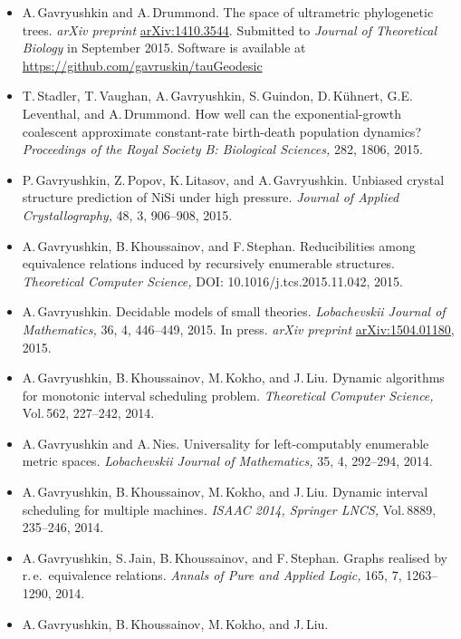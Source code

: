 \documentclass[12pt]{article}
\begin{document}
\iftoggle{full}{
\centerline{\bf Publications}
}{
\centerline{\bf Recent publications}
}
\begin{itemize}
\item A.\,Gavryushkin and A.\,Drummond.
	The space of ultrametric phylogenetic trees.
	{\em arXiv preprint} \href{http://arxiv.org/abs/1410.3544}{arXiv:1410.3544}.
	Submitted to {\em Journal of Theoretical Biology} in September 2015.
	Software is available at
	\href{https://github.com/gavruskin/tauGeodesic}{https://github.com/gavruskin/tauGeodesic}
\item T.\,Stadler, T.\,Vaughan, A.\,Gavryushkin, S.\,Guindon, D.\,K\"uhnert, G.E.\,Leventhal, and A.\,Drummond.
	How well can the exponential-growth coalescent approximate constant-rate birth-death population dynamics?
	{\em Proceedings of the Royal Society B: Biological Sciences,} 282, 1806, 2015.
\item P.\,Gavryushkin, Z.\,Popov, K.\,Litasov, and A.\,Gavryushkin.
	Unbiased crystal structure prediction of $\mathrm{NiSi}$ under high pressure.
	{\em Journal of Applied Crystallography,} 48, 3, 906--908, 2015.
\item A.\,Gavryushkin, B.\,Khoussainov, and F.\,Stephan.
	Reducibilities among equivalence relations induced by recursively enumerable structures.
	{\em Theoretical Computer Science,} DOI: 10.1016/j.tcs.2015.11.042, 2015.
\item A.\,Gavryushkin.
	Decidable models of small theories.
	{\em Lobachevskii Journal of Mathematics,} 36, 4, 446--449, 2015.
	In press.
	{\em arXiv preprint} \href{http://arxiv.org/abs/1504.01180}{arXiv:1504.01180}, 2015.
\item A.\,Gavryushkin, B.\,Khoussainov, M.\,Kokho, and J.\,Liu.
	Dynamic algorithms for monotonic interval scheduling problem.
	{\em Theoretical Computer Science,} Vol.\,562, 227--242, 2014.
\item A.\,Gavryushkin and A.\,Nies.
	Universality for left-computably enumerable  metric spaces.
	{\em Lobachevskii Journal of Mathematics,} 35, 4, 292--294, 2014.
\item A.\,Gavryushkin, B.\,Khoussainov, M.\,Kokho, and J.\,Liu.
	Dynamic interval scheduling for multiple machines.
	{\em ISAAC 2014, Springer LNCS,} Vol.\,8889, 235--246, 2014.
\item A.\,Gavryushkin, S.\,Jain, B.\,Khoussainov, and F.\,Stephan.
	Graphs realised by r.\,e.\ equivalence relations.
	{\em Annals of Pure and Applied Logic,} 165, 7, 1263--1290, 2014.
\item A.\,Gavryushkin, B.\,Khoussainov, M.\,Kokho, and J.\,Liu.

\end{itemize}
\end{document}
